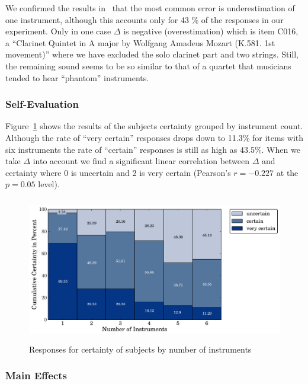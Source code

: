 We confirmed the results in~\cite{huron89} that the most common error is underestimation of one instrument, although this accounts only for 43 \% of the responses in our experiment. Only in one case $\Delta$ is negative (overestimation) which is item C016, a ``Clarinet Quintet in A major by Wolfgang Amadeus Mozart (K.581. 1st movement)'' where we have excluded the solo clarinet part and two strings. Still, the remaining sound seems to be so similar to that of a quartet that musicians tended to hear ``phantom'' instruments.

\subsubsection*{Self-Evaluation}

Figure~\ref{fig:certainty} shows the results of the subjects certainty grouped by instrument count. Although the rate of ``very certain'' responses drops down to 11.3\% for items with six instruments the rate of ``certain'' responses is still as high as 43.5\%. When we take $\Delta$ into account we find a significant linear correlation between $\Delta$ and certainty where 0 is uncertain and 2 is very certain (Pearson's $r = -0.227$ at the $p=0.05$ level).

\begin{figure}[h]
	\centering
		\includegraphics[height=2.5in]{Chapters/07_Analysis_Experiment/images/certainty.pdf}
	\caption{Responses for certainty of subjects by number of instruments}
	\label{fig:certainty}
\end{figure}

\subsubsection*{Main Effects}


